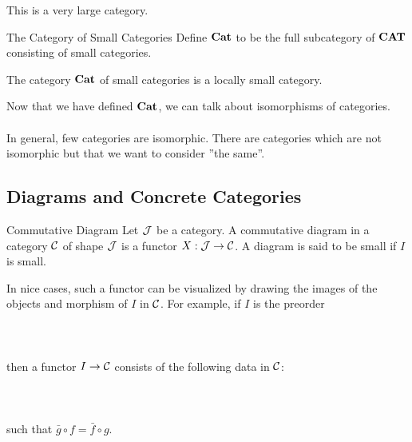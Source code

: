 \documentclass[a4paper]{article}
\begin{document}
This is a very large category. 

\begin{defn}{The Category of Small Categories}{} Define $\bold{Cat}$ to be the full subcategory of $\bold{CAT}$ consisting of small categories. 
\end{defn}

\begin{lmm}{}{} The category $\bold{Cat}$ of small categories is a locally small category. 
\end{lmm}

Now that we have defined $\bold{Cat}$, we can talk about isomorphisms of categories. \\~\\

In general, few categories are isomorphic. There are categories which are not isomorphic but that we want to consider ''the same''. 

\subsection{Diagrams and Concrete Categories}
\begin{defn}{Commutative Diagram}{} Let $\mathcal{J}$ be a category. A commutative diagram in a category $\mathcal{C}$ of shape $\mathcal{J}$ is a functor $X:\mathcal{J}\to\mathcal{C}$. A diagram is said to be small if $I$ is small. 
\end{defn}

In nice cases, such a functor can be visualized by drawing the images of the objects and morphism of $I$ in $\mathcal{C}$. For example, if $I$ is the preorder \\~\\
\\~\\
then a functor $I\to\mathcal{C}$ consists of the following data in $\mathcal{C}$: \\~\\
\\~\\
such that $\bar{g}\circ f=\bar{f}\circ g$. \\~\\
\end{document}
